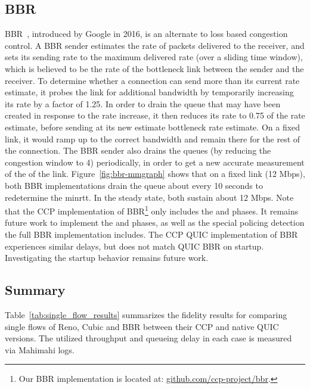 \subsection{BBR}
\label{sec:performance:single_flow:bbr}

BBR~\cite{bbrcode, bbr}, introduced by Google in 2016, is an alternate to loss based congestion control.
A BBR sender estimates the rate of packets delivered to the receiver, and sets its sending rate to the maximum delivered rate (over a sliding time window), which is believed to be the rate of the bottleneck link between the sender and the receiver.
To determine whether a connection can send more than its current rate estimate, it probes the link for additional bandwidth by temporarily increasing its rate by a factor  of 1.25.
In order to drain the queue that may have been created in response to the rate increase, it then reduces its rate to 0.75 of the rate estimate, before sending at its new estimate bottleneck rate estimate.
On a fixed link, it would ramp up to the correct bandwidth and remain there for the rest of the connection.
The BBR sender also drains the queues (by reducing the congestion window to 4) periodically, in order to get a new accurate measurement of the  of the link.
Figure~\ref{fig:bbr-mmgraph} shows that on a fixed link (12 Mbps), both BBR implementations drain the queue about every 10 seconds to redetermine the minrtt.
In the steady state, both sustain about 12 Mbps.
Note that the CCP implementation of BBR\footnote{Our BBR implementation is located at: \url{github.com/ccp-project/bbr}.} only includes the  and  phases.
It remains future work to implement the  and  phases, as well as the special policing detection the full BBR implementation includes.
The CCP QUIC implementation of BBR experiences similar delays, but does not match QUIC BBR on startup.
Investigating the startup behavior remains future work.

\subsection{Summary}

Table~\ref{tab:single_flow_results} summarizes the fidelity results for comparing single flows of Reno, Cubic and BBR between their CCP and native QUIC versions.
The utilized throughput and queueing delay in each case is measured via Mahimahi logs.


